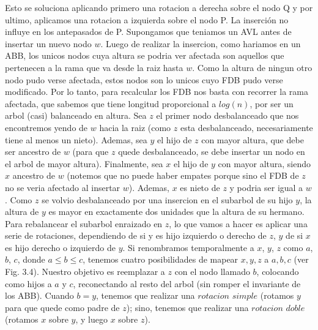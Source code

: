 \documentclass[10pt,a4paper]{article}
\begin{document}
Esto se soluciona aplicando primero una rotacion a derecha sobre el nodo Q y por ultimo, aplicamos una rotacion a izquierda sobre el nodo P.
\newline
\newline
La inserción no influye en los antepasados de P.
\newline
\newline
\newline
Supongamos que teniamos un AVL antes de insertar un nuevo nodo $w$. Luego de realizar la insercion, como hariamos en un ABB, los unicos nodos cuya altura se podria ver afectada son aquellos que pertenecen a la rama que va desde la raiz hasta $w$. Como la altura de ningun otro nodo pudo verse afectada, estos nodos son lo unicos cuyo FDB pudo verse modificado. Por lo tanto, para recalcular los FDB nos basta con recorrer la rama afectada, que sabemos que tiene longitud proporcional a $log(n)$, por ser un arbol (casi) balanceado en altura.
\newline
\newline
Sea $z$ el primer nodo desbalanceado que nos encontremos yendo de $w$ hacia la raiz (como $z$ esta desbalanceado, necesariamente tiene al menos un nieto). Ademas, sea $y$ el hijo de $z$ con mayor altura, que debe ser ancestro de $w$ (para que $z$ quede desbalanceado, se debe insertar un nodo en el arbol de mayor altura). Finalmente, sea $x$ el hijo de $y$ con mayor altura, siendo $x$ ancestro de $w$ (notemos que no puede haber empates porque sino el FDB de $z$ no se veria afectado al insertar $w$). Ademas, $x$ es nieto de $z$ y podria ser igual a $w$. Como $z$ se volvio desbalanceado por una insercion en el subarbol de su hijo
$y$, la altura de $y$ es mayor en exactamente dos unidades que la altura de su hermano.
\newline
\newline
Para rebalancear el subarbol enraizado en $z$, lo que vamos a hacer es aplicar una serie de rotaciones, dependiendo de si y es hijo izquierdo o derecho de $z$, $y$ de si $x$ es hijo derecho o izquierdo de $y$. Si renombramos temporalmente a $x$, $y$, $z$ como $a$, $b$, $c$, donde $a \leq b \leq c$, tenemos cuatro posibilidades de mapear $x, y, z$ a $a, b, c$ (ver Fig. 3.4). Nuestro objetivo es reemplazar a $z$ con el nodo llamado $b$, colocando como hijos a $a$ y $c$, reconectando al resto del arbol (sin romper el invariante de los ABB). Cuando $b = y$, tenemos que realizar una $rotacion$ $simple$ (rotamos $y$ para que quede como padre de $z$); sino, tenemos que realizar una $rotacion$ $doble$ (rotamos $x$ sobre $y$, y luego $x$ sobre $z$).
\end{document}
